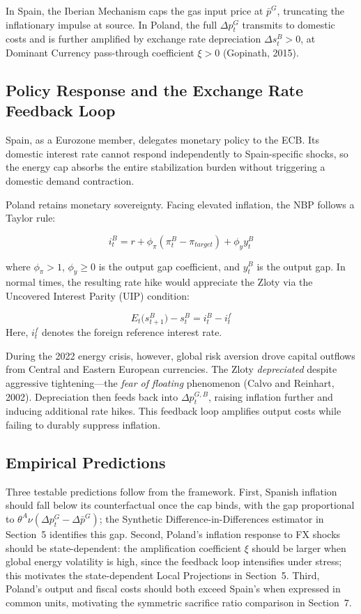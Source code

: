 \documentclass[12pt, a4paper]{article}
\begin{document}
In Spain, the Iberian Mechanism caps the gas input price at $\bar{p}^G$, truncating the inflationary impulse at source. In Poland, the full $\Delta p_t^G$ transmits to domestic costs and is further amplified by exchange rate depreciation $\Delta s_t^B > 0$, at Dominant Currency pass-through coefficient $\xi > 0$ (Gopinath, 2015).


\subsection{Policy Response and the Exchange Rate Feedback Loop}

Spain, as a Eurozone member, delegates monetary policy to the ECB. Its domestic interest rate cannot respond independently to Spain-specific shocks, so the energy cap absorbs the entire stabilization burden without triggering a domestic demand contraction.

Poland retains monetary sovereignty. Facing elevated inflation, the NBP follows a Taylor rule:

\[
i_t^B = r + \phi_\pi(\pi_t^B - \pi_{target}) + \phi_y y_t^B
\]

where $\phi_\pi > 1$, $\phi_y \geq 0$ is the output gap coefficient, and $y_t^B$ is the output gap. In normal times, the resulting rate hike would appreciate the Zloty via the Uncovered Interest Parity (UIP) condition:

\[
E_t\bigl(s_{t+1}^{B}\bigr) - s_t^{B} = i_t^{B} - i_t^{f}
\]
Here, $i_t^{f}$ denotes the foreign reference interest rate.

During the 2022 energy crisis, however, global risk aversion drove capital outflows from Central and Eastern European currencies. The Zloty \textit{depreciated} despite aggressive tightening---the \textit{fear of floating} phenomenon (Calvo and Reinhart, 2002). Depreciation then feeds back into $\Delta p_t^{G,B}$, raising inflation further and inducing additional rate hikes. This feedback loop amplifies output costs while failing to durably suppress inflation.


\subsection{Empirical Predictions}

Three testable predictions follow from the framework. First, Spanish inflation should fall below its counterfactual once the cap binds, with the gap proportional to $\theta^A \nu (\Delta p_t^G - \Delta \bar{p}^G)$; the Synthetic Difference-in-Differences estimator in Section~5 identifies this gap. Second, Poland's inflation response to FX shocks should be state-dependent: the amplification coefficient $\xi$ should be larger when global energy volatility is high, since the feedback loop intensifies under stress; this motivates the state-dependent Local Projections in Section~5. Third, Poland's output and fiscal costs should both exceed Spain's when expressed in common units, motivating the symmetric sacrifice ratio comparison in Section~7.
\end{document}
